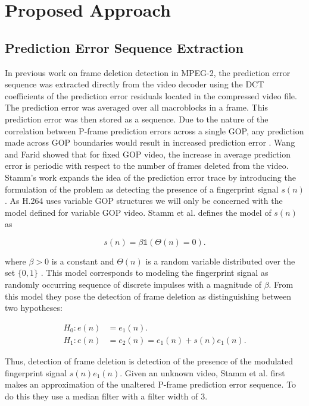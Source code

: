 \chapter{Proposed Approach}

\section{Prediction Error Sequence Extraction}

In previous work on frame deletion detection in MPEG-2, the prediction error sequence was extracted directly from the video decoder using the DCT coefficients of the prediction error residuals located in the compressed video file. The prediction error was averaged over all macroblocks in a frame. This prediction error was then stored as a sequence. Due to the nature of the correlation between P-frame prediction errors across a single GOP, any prediction made across GOP boundaries would result in increased prediction error \cite{wang}. Wang and Farid showed that for fixed GOP video, the increase in average prediction error is periodic with respect to the number of frames deleted from the video. Stamm's work expands the idea of the prediction error trace by introducing the formulation of the problem as detecting the presence of a fingerprint signal $s(n)$. As H.264 uses variable GOP structures we will only be concerned with the model defined for variable GOP video. Stamm et al. defines the model of $s(n)$ as

\begin{equation}
s(n) = \beta \mathds{1} \left( \Theta(n) = 0 \right).
\label{stammModel}
\end{equation}

where $\beta > 0$ is a constant and $\Theta(n)$ is a random variable distributed over the set $\{0, 1\}$ \cite{stamm}. This model corresponds to modeling the fingerprint signal as randomly occurring sequence of discrete impulses with a magnitude of $\beta$. From this model they pose the detection of frame deletion as distinguishing between two hypotheses:

\begin{equation}
\begin{aligned}
  H_{0} : e(n) &= e_{1}(n). \\
  H_{1} : e(n) &= e_{2}(n) = e_{1}(n) + s(n)e_{1}(n).
\end{aligned}
\end{equation}

Thus, detection of frame deletion is detection of the presence of the modulated fingerprint signal $s(n)e_{1}(n)$. Given an unknown video, Stamm et al. first makes an approximation of the unaltered P-frame prediction error sequence. To do this they use a median filter with a filter width of 3.

